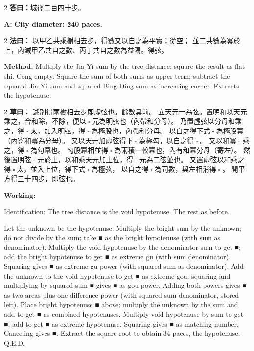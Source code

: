 \documentclass[11pt,a4paper]{article}
\let\origsquare\square
\renewcommand{\square}{\ensuremath{\origsquare}}%
\newcommand{\fayue}[1]{%
  \noindent\textcolor{methodcolor}{\textbf{法曰：}}{\tradfont #1}\par\nopagebreak%
}
\newcommand{\fayueeng}[1]{%
  \noindent\textcolor{engcolor}{\textbf{Method: }}{#1}\par\nopagebreak%
}
\newcommand{\tsaoyue}[1]{%
  \noindent\textcolor{workcolor}{\textbf{草曰：}}{\tradfont #1}\par%
}
\newcommand{\tsaoyueeng}[1]{%
  \noindent\textcolor{engcolor}{\textbf{Working: }}{\small #1}\par%
}
\newcommand{\dayue}[1]{%
  \noindent\textcolor{anscolor}{\textbf{答曰：}}{\tradfont #1}\par\nopagebreak%
}
\newcommand{\dayueeng}[1]{%
  \noindent\textcolor{engcolor}{\textbf{A: }}{\bfseries #1}\par\nopagebreak%
}
\begin{document}
\begin{paracol}{2}
\dayue{城徑二百四十步。}
\switchcolumn
\dayueeng{City diameter: 240 paces.}
\end{paracol}

\begin{paracol}{2}
\fayue{%
以甲乙共乘樹相去步，得數又以自之為平實；從空；
並二共數為冪於上，內減甲乙共自之數、丙丁共自之數為益隅。得弦。}
\switchcolumn
\fayueeng{%
Multiply the Jia-Yi sum by the tree distance; square the result as flat shi. Cong empty. Square the sum of both sums as upper term; subtract the squared Jia-Yi sum and squared Bing-Ding sum as increasing corner. Extracts the hypotenuse.}
\end{paracol}

\begin{paracol}{2}
\tsaoyue{%
識別得兩樹相去步即虛弦也。餘數具前。
立天元一為弦。置明和以天元乘之，合和除，不除，便以$ \; \square \; $元為明弦也（內帶和分母）。
乃置虛弦以分母和乘之，得$ \; \square \; $太，加入明弦，得$ \; \square \; $為極股也，內帶和分母。
以自之得下式$ \; \square \; $為極股冪（內寄和冪為分母）。
又以天元加虛弦得下$ \; \square \; $為極勾，以自之得$ \; \square \; $。
又以和冪$ \; \square \; $乘之，得$ \; \square \; $為勾冪也。
勾股冪相並得$ \; \square \; $為兩積一較冪也，內有和冪分母（寄左）。
然後置明弦$ \; \square \; $元於上，以和乘天元加上位，得$ \; \square \; $元為二弦並也。
又置虛弦以和乘之得$ \; \square \; $太，並入上位，得下式$ \; \square \; $為極弦，
以自之得$ \; \square \; $為同數，與左相消得$ \; \square \; $。
開平方得三十四步，即弦也。}
\switchcolumn
\tsaoyueeng{%
Identification: The tree distance is the void hypotenuse. The rest as before.

Let the unknown be the hypotenuse. Multiply the bright sum by the unknown; do not divide by the sum; take ■ as the bright hypotenuse (with sum as denominator). Multiply the void hypotenuse by the denominator sum to get ■; add the bright hypotenuse to get ■ as extreme gu (with sum denominator). Squaring gives ■ as extreme gu power (with squared sum as denominator). Add the unknown to the void hypotenuse to get ■ as extreme gou; squaring and multiplying by squared sum ■ gives ■ as gou power. Adding both powers gives ■ as two areas plus one difference power (with squared sum denominator, stored left). Place bright hypotenuse ■ above; multiply the unknown by the sum and add to get ■ as combined hypotenuses. Multiply void hypotenuse by sum to get ■; add to get ■ as extreme hypotenuse. Squaring gives ■ as matching number. Canceling gives ■. Extract the square root to obtain 34 paces, the hypotenuse. Q.E.D.}
\end{paracol}
\end{document}
